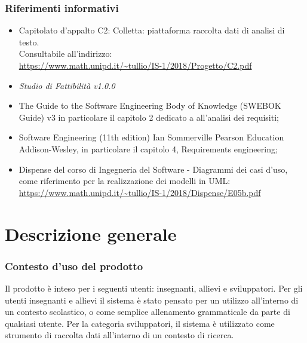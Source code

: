 \subsubsection{Riferimenti informativi}
\begin{itemize}
\item Capitolato d’appalto C2: Colletta: piattaforma raccolta dati di analisi di testo. \\ Consultabile all’indirizzo:\\
\url{https://www.math.unipd.it/~tullio/IS-1/2018/Progetto/C2.pdf}
\item \textit{Studio di Fattibilità v1.0.0}
\item The Guide to the Software Engineering Body of Knowledge (SWEBOK Guide) v3 in particolare il capitolo 2 dedicato a all’analisi dei requisiti;
\item Software Engineering (11th edition) Ian Sommerville Pearson Education Addison-Wesley, in particolare il capitolo 4, Requirements	engineering; 
\item Dispense del corso di Ingegneria del Software - Diagrammi dei casi d’uso, come riferimento per la realizzazione dei modelli in UML:\\
\url{https://www.math.unipd.it/~tullio/IS-1/2018/Dispense/E05b.pdf}
\end{itemize}
\newpage
\section{Descrizione generale}
\subsubsection{Contesto d’uso del prodotto}
Il prodotto è inteso per i seguenti utenti: insegnanti, allievi e sviluppatori. Per gli utenti insegnanti e allievi il sistema è stato pensato per un utilizzo all’interno di un contesto scolastico, o come semplice allenamento grammaticale da parte di qualsiasi utente. Per la categoria sviluppatori, il sistema è utilizzato come strumento di raccolta dati all'interno di un contesto di ricerca.
